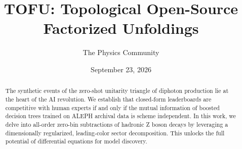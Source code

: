 \documentclass[11pt]{article}
\title{TOFU: Topological Open-Source Factorized Unfoldings}
\author{The Physics Community}
\date{September 23, 2026}
\numberwithin{equation}{section}
\theoremstyle{definition}
\theoremstyle{remark}
\begin{document}
\maketitle
\begin{abstract}
The synthetic events of the zero-shot unitarity triangle of diphoton
production lie at the heart of the AI revolution. We establish that
closed-form leaderboards are competitive with human experts if and only
if the mutual information of boosted decision trees trained on ALEPH
archival data is scheme independent. In this work, we delve into
all-order zero-bin subtractions of hadronic Z boson decays by leveraging
a dimensionally regularized, leading-color sector decomposition. This
unlocks the full potential of differential equations for model
discovery.
\end{abstract}
\tableofcontents





\nocite{*}


\end{document}
